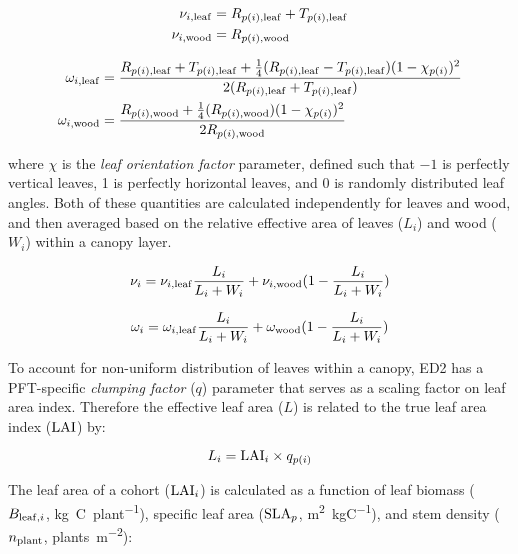 \begin{align}
  \begin{split}
    \nu_{i, \mathrm{leaf}} &= R_{p(i), \mathrm{leaf}} + T_{p(i), \mathrm{leaf}}\\
    \nu_{i, \mathrm{wood}} &= R_{p(i), \mathrm{wood}}\\
  \end{split}
\end{align}

\begin{align}
  \begin{split}
    \omega_{i, \mathrm{leaf}} &= \frac{R_{p(i), \mathrm{leaf}} + T_{p(i), \mathrm{leaf}} + \frac{1}{4} (R_{p(i), \mathrm{leaf}}-T_{p(i), \mathrm{leaf}})(1 - \chi_{p(i)})^2}{2 (R_{p(i), \mathrm{leaf}}+T_{p(i), \mathrm{leaf}})}\\
    \omega_{i, \mathrm{wood}} &= \frac{R_{p(i), \mathrm{wood}} + \frac{1}{4} (R_{p(i), \mathrm{wood}})(1 - \chi_{p(i)})^2}{2 R_{p(i), \mathrm{wood}}}
  \end{split}
\end{align}

where $\chi$ is the \emph{leaf orientation factor} parameter, defined such that $-1$ is perfectly vertical leaves, 1 is perfectly horizontal leaves, and 0 is randomly distributed leaf angles.
Both of these quantities are calculated independently for leaves and wood, and then averaged based on the relative effective area of leaves ($L_{i}$) and wood ($W_{i}$) within a canopy layer.

\begin{equation}
  \nu_{i} = \nu_{i, \mathrm{leaf}} \frac{L_{i}}{L_{i} + W_{i}} + \nu_{i, \mathrm{wood}} (1 - \frac{L_{i}}{L_{i} + W_{i}})
\end{equation}

\begin{equation}
  \omega_{i} = \omega_{i, \mathrm{leaf}} \frac{L_{i}}{L_{i} + W_{i}} + \omega_{\mathrm{wood}} (1 - \frac{L_{i}}{L_{i} + W_{i}})
\end{equation}

To account for non-uniform distribution of leaves within a canopy, ED2 has a PFT-specific \emph{clumping factor} ($q$) parameter that serves as a scaling factor on leaf area index.
Therefore the effective leaf area ($L$) is related to the true leaf area index ($\mathrm{LAI}$) by:

\begin{equation}
  L_{i} = \mathrm{LAI}_{i} \times q_{p(i)}
\end{equation}

The leaf area of a cohort ($\mathrm{LAI}_{i}$) is calculated as a function of leaf biomass ($B_{\mathrm{leaf}, i}$, \unit{kg C ~ plant^{-1}}), specific leaf area ($\mathrm{SLA}_{p}$, \unit{m^2 ~ kgC^{-1}}), and stem density ($n_{\mathrm{plant}}$, \unit{plants ~ m^{-2}}):

